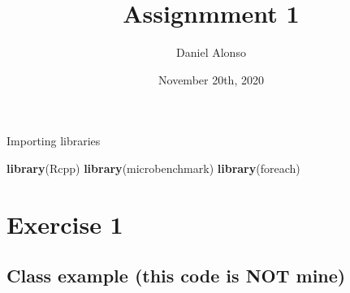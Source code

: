 \documentclass[]{article}
\title{Assignmment 1}
\author{Daniel Alonso}
\date{November 20th, 2020}
\newenvironment{Shaded}{\begin{snugshade}}{\end{snugshade}}
\newcommand{\KeywordTok}[1]{\textcolor[rgb]{0.13,0.29,0.53}{\textbf{#1}}}
\newcommand{\NormalTok}[1]{#1}
\begin{document}
\maketitle

Importing libraries

\begin{Shaded}
\begin{Highlighting}[]
\KeywordTok{library}\NormalTok{(Rcpp)}
\KeywordTok{library}\NormalTok{(microbenchmark)}
\KeywordTok{library}\NormalTok{(foreach)}
\end{Highlighting}
\end{Shaded}

\hypertarget{exercise-1}{%
\section{Exercise 1}\label{exercise-1}}

\hypertarget{class-example-this-code-is-not-mine}{%
\subsection{Class example (this code is NOT
mine)}\label{class-example-this-code-is-not-mine}}
\end{document}
